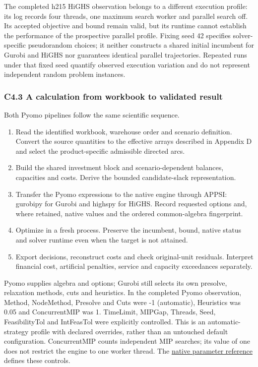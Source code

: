 \documentclass[
  english,
  11pt,
  a4paper,
]{article}
\providecommand{\tightlist}{%
  \setlength{\itemsep}{0pt}\setlength{\parskip}{0pt}}
\begin{document}
The completed h215 HiGHS observation belongs to a different execution
profile: its log records four threads, one maximum search worker and
parallel search off. Its accepted objective and bound remain valid, but
its runtime cannot establish the performance of the prospective parallel
profile. Fixing seed 42 specifies solver-specific pseudorandom choices;
it neither constructs a shared initial incumbent for Gurobi and HiGHS
nor guarantees identical parallel trajectories. Repeated runs under that
fixed seed quantify observed execution variation and do not represent
independent random problem instances.

\subsubsection{C4.3 A calculation from workbook to validated
result}\label{c4.2-a-calculation-from-workbook-to-validated-result}

Both Pyomo pipelines follow the same scientific sequence.

\begin{enumerate}
\def\labelenumi{\arabic{enumi}.}
\tightlist
\item
  Read the identified workbook, warehouse order and scenario definition.
  Convert the source quantities to the effective arrays described in
  Appendix D and select the product-specific admissible directed arcs.
\item
  Build the shared investment block and scenario-dependent balances,
  capacities and costs. Derive the bounded candidate-slack
  representation.
\item
  Transfer the Pyomo expressions to the native engine through APPSI:
  gurobipy for Gurobi and highspy for HiGHS. Record requested options
  and, where retained, native values and the ordered common-algebra
  fingerprint.
\item
  Optimize in a fresh process. Preserve the incumbent, bound, native
  status and solver runtime even when the target is not attained.
\item
  Export decisions, reconstruct costs and check original-unit residuals.
  Interpret financial cost, artificial penalties, service and capacity
  exceedances separately.
\end{enumerate}

Pyomo supplies algebra and options; Gurobi still selects its own
presolve, relaxation methods, cuts and heuristics. In the completed
Pyomo observation, Method, NodeMethod, Presolve and Cuts were -1
(automatic), Heuristics was 0.05 and ConcurrentMIP was 1. TimeLimit,
MIPGap, Threads, Seed, FeasibilityTol and IntFeasTol were explicitly
controlled. This is an automatic-strategy profile with declared
overrides, rather than an untouched default configuration. ConcurrentMIP
counts independent MIP searches; its value of one does not restrict the
engine to one worker thread. The
\href{https://docs.gurobi.com/projects/optimizer/en/current/reference/parameters.html}{native
parameter reference} defines these controls.
\end{document}
